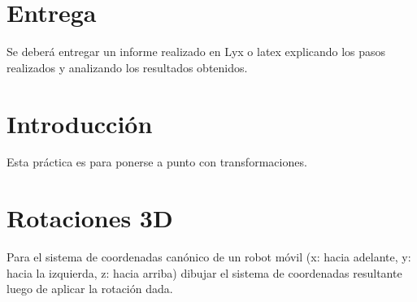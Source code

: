 \documentclass[tp]{lcc}
\begin{document}
\maketitle

\section{Entrega}
Se deberá entregar un informe realizado en Lyx o latex explicando los pasos realizados y analizando los resultados obtenidos.

\section{Introducción}
Esta práctica es para ponerse a punto con transformaciones.

\section{Rotaciones 3D}

\begin{problema} Para el sistema de coordenadas canónico de un robot móvil (x: hacia adelante, y: hacia la izquierda, z: hacia arriba) dibujar el sistema de coordenadas resultante luego de aplicar la rotación dada.
 
    \begin{figure}[!h]
    \centering
    \hspace{3cm}
    \subfloat[$R_{y}(90)$]
    {
        
    }
    \hspace{3cm}
    \subfloat[$R_{x}(-90)R_{y}(90)$]
    {
    
    }
    \hspace{3cm}
    \subfloat[$R_{z}(180)R_{x}(-90)R_{y}(90)$]{}
    \end{figure}

\end{problema}
\end{document}
